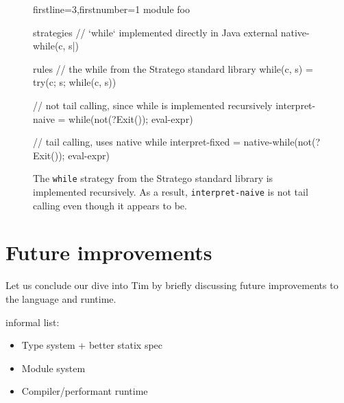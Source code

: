 \begin{figure}
  \begin{stratego*}{firstline=3,firstnumber=1}
module foo

strategies
  // `while` implemented directly in Java
  external native-while(c, s|)

rules
  // the while from the Stratego standard library
  while(c, s) = try(c; s; while(c, s))

  // not tail calling, since while is implemented recursively
  interpret-naive = while(not(?Exit()); eval-expr)

  // tail calling, uses native while
  interpret-fixed = native-while(not(?Exit()); eval-expr)
  \end{stratego*}
  \caption{The \texttt{while} strategy from the Stratego standard library is implemented recursively. As a result, \texttt{interpret-naive} is not tail calling even though it appears to be.}
  \label{fig:tim_interpreter_cps}
\end{figure}

\section{Future improvements}
\label{sec:tim_future}
Let us conclude our dive into Tim by briefly discussing future improvements to the language and runtime. 


informal list: 
\begin{itemize}
  \item Type system + better statix spec
  \item Module system
  \item Compiler/performant runtime
\end{itemize}

